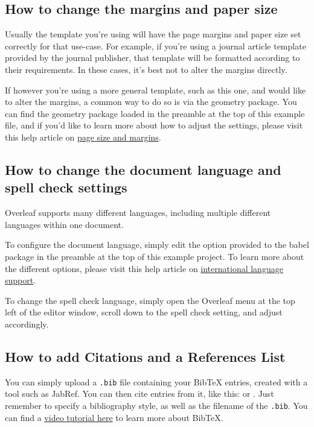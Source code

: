\documentclass{article}
\begin{document}
\begin{Data science tools for finance final project}
\subsection{How to change the margins and paper size}

Usually the template you're using will have the page margins and paper size set correctly for that use-case. For example, if you're using a journal article template provided by the journal publisher, that template will be formatted according to their requirements. In these cases, it's best not to alter the margins directly.

If however you're using a more general template, such as this one, and would like to alter the margins, a common way to do so is via the geometry package. You can find the geometry package loaded in the preamble at the top of this example file, and if you'd like to learn more about how to adjust the settings, please visit this help article on \href{https://www.overleaf.com/learn/latex/page_size_and_margins}{page size and margins}.

\subsection{How to change the document language and spell check settings}

Overleaf supports many different languages, including multiple different languages within one document. 

To configure the document language, simply edit the option provided to the babel package in the preamble at the top of this example project. To learn more about the different options, please visit this help article on \href{https://www.overleaf.com/learn/latex/International_language_support}{international language support}.

To change the spell check language, simply open the Overleaf menu at the top left of the editor window, scroll down to the spell check setting, and adjust accordingly.

\subsection{How to add Citations and a References List}

You can simply upload a \verb|.bib| file containing your BibTeX entries, created with a tool such as JabRef. 
You can then cite entries from it, like this: 
\cite{fama1992cross} or \cite{sharpe1964capital}. 
Just remember to specify a bibliography style, as well as the filename of the \verb|.bib|. You can find a \href{https://www.overleaf.com/help/97-how-to-include-a-bibliography-using-bibtex}{video tutorial here} to learn more about BibTeX.


\end{Data science tools for finance final project}
\end{document}
